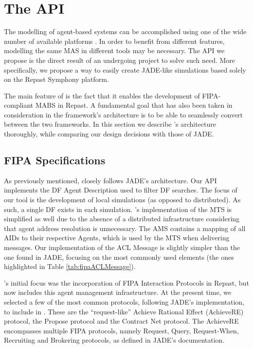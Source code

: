 \section{The \apiname{} API} %
\label{sec:proposal}

The modelling of agent-based systems can be accomplished using one of the wide number of available platforms \cite{survey,survey2}. In order to benefit from different features, modelling the same MAS in different tools may be necessary.
The API we propose is the direct result of an undergoing project to solve such need. More specifically, we propose a way to easily create JADE-like simulations based solely on the Repast Symphony platform.

The main feature of \apiname{} is the fact that it enables the development of FIPA-compliant MABS in Repast.
A fundamental goal that has also been taken in consideration in the framework's architecture is to be able to seamlessly convert between the two frameworks.
In this section we describe \apiname{}'s architecture thoroughly, while comparing our design decisions with those of JADE.


\subsection{\gls{FIPA} Specifications}

As previously mentioned, \apiname{} closely follows JADE's architecture.
Our API implements the DF Agent Description used to filter DF searches. The focus of our tool is the development of local simulations (as opposed to distributed). As such, a single DF exists in each simulation. \apiname{}'s implementation of the MTS is simplified as well due to the absence of a distributed infrastructure considering that agent address resolution is unnecessary. The AMS contains a mapping of all AIDs to their respective Agents, which is used by the MTS when delivering messages.
Our implementation of the ACL Message is slightly simpler than the one found in JADE, focusing on the most commonly used elements (the ones highlighted in Table \ref{tab:fipaACLMessage}).

\apiname{}'s initial focus was the incorporation of \gls{FIPA} Interaction Protocols in Repast, but now includes this agent management infrastructure. At the present time, we selected a few of the most common protocols, following JADE's implementation, to include in \apiname{}.
These are the ``request-like'' Achieve Rational Effect (AchieveRE) protocol, the Propose protocol and the Contract Net protocol. The AchieveRE encompasses multiple \gls{FIPA} protocols, namely Request, Query, Request-When, Recruiting and Brokering protocols, as defined in JADE's documentation.


